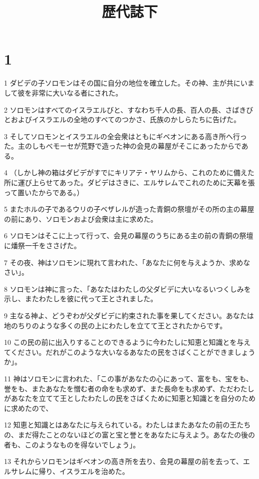 

\title{歴代誌下}


\chapter{1}

\par 1 ダビデの子ソロモンはその国に自分の地位を確立した。その神、主が共にいまして彼を非常に大いなる者にされた。
\par 2 ソロモンはすべてのイスラエルびと、すなわち千人の長、百人の長、さばきびとおよびイスラエルの全地のすべてのつかさ、氏族のかしらたちに告げた。
\par 3 そしてソロモンとイスラエルの全会衆はともにギベオンにある高き所へ行った。主のしもべモーセが荒野で造った神の会見の幕屋がそこにあったからである。
\par 4 （しかし神の箱はダビデがすでにキリアテ・ヤリムから、これのために備えた所に運び上らせてあった。ダビデはさきに、エルサレムでこれのために天幕を張って置いたからである。）
\par 5 またホルの子であるウリの子ベザレルが造った青銅の祭壇がその所の主の幕屋の前にあり、ソロモンおよび会衆は主に求めた。
\par 6 ソロモンはそこに上って行って、会見の幕屋のうちにある主の前の青銅の祭壇に燔祭一千をささげた。
\par 7 その夜、神はソロモンに現れて言われた、「あなたに何を与えようか、求めなさい」。
\par 8 ソロモンは神に言った、「あなたはわたしの父ダビデに大いなるいつくしみを示し、またわたしを彼に代って王とされました。
\par 9 主なる神よ、どうぞわが父ダビデに約束された事を果してください。あなたは地のちりのような多くの民の上にわたしを立てて王とされたからです。
\par 10 この民の前に出入りすることのできるように今わたしに知恵と知識とを与えてください。だれがこのような大いなるあなたの民をさばくことができましょうか」。
\par 11 神はソロモンに言われた、「この事があなたの心にあって、富をも、宝をも、誉をも、またあなたを憎む者の命をも求めず、また長命をも求めず、ただわたしがあなたを立てて王としたわたしの民をさばくために知恵と知識とを自分のために求めたので、
\par 12 知恵と知識とはあなたに与えられている。わたしはまたあなたの前の王たちの、まだ得たことのないほどの富と宝と誉とをあなたに与えよう。あなたの後の者も、このようなものを得ないでしょう」。
\par 13 それからソロモンはギベオンの高き所を去り、会見の幕屋の前を去って、エルサレムに帰り、イスラエルを治めた。
